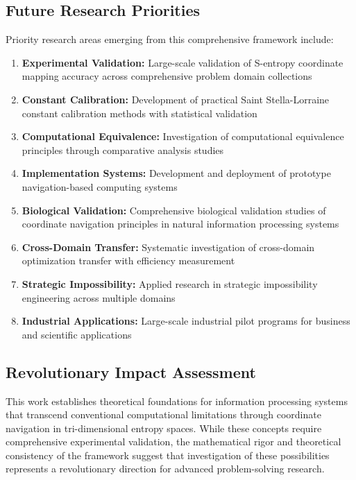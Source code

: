 \documentclass[11pt]{article}
\theoremstyle{definition}
\theoremstyle{remark}
\begin{document}
{\subsection{Future Research Priorities}

Priority research areas emerging from this comprehensive framework include:

\begin{enumerate}
\item \textbf{Experimental Validation:} Large-scale validation of S-entropy coordinate mapping accuracy across comprehensive problem domain collections
\item \textbf{Constant Calibration:} Development of practical Saint Stella-Lorraine constant calibration methods with statistical validation
\item \textbf{Computational Equivalence:} Investigation of computational equivalence principles through comparative analysis studies
\item \textbf{Implementation Systems:} Development and deployment of prototype navigation-based computing systems
\item \textbf{Biological Validation:} Comprehensive biological validation studies of coordinate navigation principles in natural information processing systems
\item \textbf{Cross-Domain Transfer:} Systematic investigation of cross-domain optimization transfer with efficiency measurement
\item \textbf{Strategic Impossibility:} Applied research in strategic impossibility engineering across multiple domains
\item \textbf{Industrial Applications:} Large-scale industrial pilot programs for business and scientific applications
\end{enumerate}

\subsection{Revolutionary Impact Assessment}

This work establishes theoretical foundations for information processing systems that transcend conventional computational limitations through coordinate navigation in tri-dimensional entropy spaces. While these concepts require comprehensive experimental validation, the mathematical rigor and theoretical consistency of the framework suggest that investigation of these possibilities represents a revolutionary direction for advanced problem-solving research.

}
\end{document}
